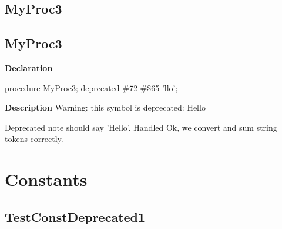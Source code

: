 \documentclass{report}
\newif\ifpdf
\begin{document}
\subsection*{\large{\textbf{MyProc3}}\normalsize\hspace{1ex}\hrulefill}
\else
\subsection*{MyProc3}
\fi
\label{ok_deprecated_directive_note-MyProc3}
\begin{list}{}{
\setlength{\itemindent}{0cm}
\setlength{\listparindent}{0cm}
\setlength{\leftmargin}{\evensidemargin}
\addtolength{\leftmargin}{\tmplength}
\settowidth{\labelsep}{X}
\addtolength{\leftmargin}{\labelsep}
\setlength{\labelwidth}{\tmplength}
}
\item[\textbf{Declaration}\hfill]
\ifpdf
\begin{flushleft}
\fi
\begin{ttfamily}
procedure MyProc3; deprecated {\#}72 {\#}{\$}65 'llo';\end{ttfamily}

\ifpdf
\end{flushleft}
\fi

\par
\item[\textbf{Description}]
Warning: this symbol is deprecated: Hello

Deprecated note should say 'Hello'. Handled Ok, we convert and sum string tokens correctly.

\end{list}
\section{Constants}
\ifpdf
\subsection*{\large{\textbf{TestConstDeprecated1}}\normalsize\hspace{1ex}\hrulefill}
\else
\end{document}
